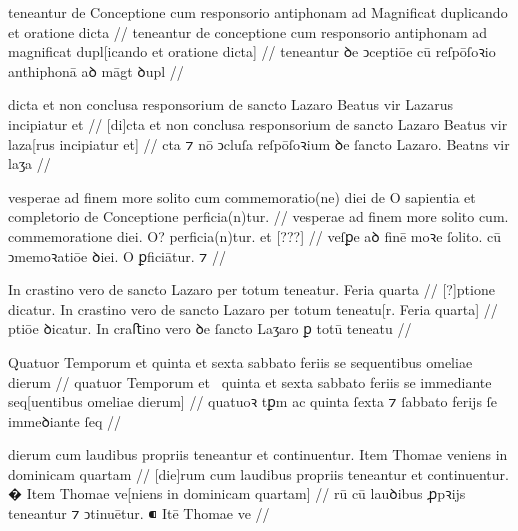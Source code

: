 \ex \bg
\gla
{}
teneantur de Conceptione cum responsorio antiphonam ad Magnificat duplicando et oratione
dicta
//
\glRekonstrukcja
{}
teneantur de conceptione cum responsorio antiphonam ad magnificat dupl[icando et oratione
dicta]
//
\glU
{}
teneantur ꝺe ↄceptiōe cū reſpōſoꝛio anthiphonā aꝺ māgt ꝺupl   
//
\endgl
\xe




\ex \bg
\gla
{}
dicta et non conclusa responsorium de sancto Lazaro Beatus vir Lazarus
incipiatur et 
//
\glRekonstrukcja
{}
[di]cta et non conclusa responsorium de sancto Lazaro Beatus vir laza[rus
incipiatur et] 
//
\glU
{}
cta ⁊ nō ↄcluſa reſpōſoꝛium ꝺe ſancto Lazaro. Beatns vir laʒa  
//
\endgl
\xe



\ex \bg
\gla
{}
vesperae ad finem more solito cum commemoratio(ne) diei
de O sapientia et completorio de Conceptione perficia(n)tur.
//
\glRekonstrukcja
{}
vesperae ad finem more solito cum. commemoratione diei.
{} O? {} {} {} {} perficia(n)tur. et
[???]
//
\glU
{}
veſꝑe aꝺ finē moꝛe ſolito. cū ↄmemoꝛatiōe ꝺiei. {} O {} {} {} {} ꝑficiātur. ⁊ 
//
\endgl
\xe



\ex \bg
\gla
{}
{} {} In crastino vero de sancto Lazaro per totum teneatur.
Feria quarta 
//
\glRekonstrukcja
{}
[?]ptione dicatur.
In crastino vero de sancto Lazaro per totum teneatu[r.
Feria quarta] 
//
\glU
{}
ptiōe ꝺicatur. In craﬅino vero ꝺe ſancto Laʒaro ꝑ totū teneatu  
//
\endgl
\xe



\ex \bg
\gla
{}
Quatuor Temporum et quinta et sexta sabbato feriis se
{} sequentibus omeliae dierum
//
\glRekonstrukcja
{}
quatuor Temporum et~ quinta et sexta sabbato feriis se
immediante seq[uentibus omeliae dierum]
//
\glU
{}
quatuoꝛ tꝑm ac quinta {} ſexta ⁊ ſabbato ferijs ſe immeꝺiante ſeq  
//
\endgl
\xe



\ex \bg
\gla
{}
dierum cum laudibus propriis teneantur et continuentur.
{} Item Thomae veniens in dominicam quartam
//
\glRekonstrukcja
{}
[die]rum cum laudibus propriis teneantur et continuentur.
� Item Thomae ve[niens in dominicam quartam]
//
\glU
{}
rū cū lauꝺibus ꝓpꝛijs teneantur ⁊ ↄtinuētur. ⁌ Itē Thomae ve   
//
\endgl
\xe


